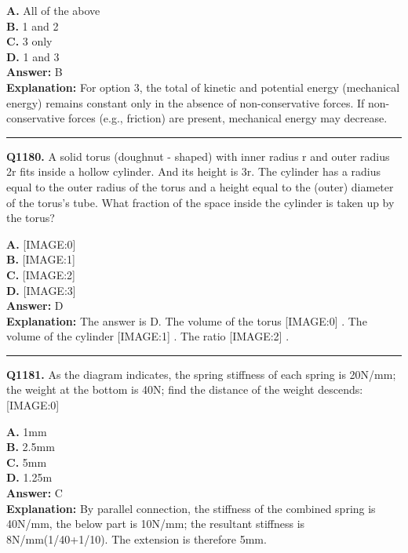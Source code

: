 \documentclass[12pt]{article}
\begin{document}
\textbf{A.} All of the above \\
\textbf{B.} 1 and 2 \\
\textbf{C.} 3 only \\
\textbf{D.} 1 and 3 \\

\textbf{Answer:} B \\
\textbf{Explanation:} For option 3, the total of kinetic and potential energy (mechanical energy) remains constant only in the absence of non-conservative forces. If non-conservative forces (e.g., friction) are present, mechanical energy may decrease.

\hrule
\vspace{1em}


\noindent
\textbf{Q1180.} A solid torus (doughnut - shaped) with inner radius r and outer radius 2r fits inside a hollow cylinder. And its height is 3r. The cylinder has a radius equal to the outer radius of the torus and a height equal to the (outer) diameter of the torus's tube. What fraction of the space inside the cylinder is taken up by the torus?



\textbf{A.} [IMAGE:0] \\
\textbf{B.} [IMAGE:1] \\
\textbf{C.} [IMAGE:2] \\
\textbf{D.} [IMAGE:3] \\

\textbf{Answer:} D \\
\textbf{Explanation:} The answer is D.
The volume of the torus
[IMAGE:0]
. The volume of the cylinder
[IMAGE:1]
. The ratio
[IMAGE:2]
.

\hrule
\vspace{1em}


\noindent
\textbf{Q1181.} As the diagram indicates, the spring stiffness of each spring is 20N/mm; the weight at the bottom is 40N; find the distance of the weight descends:
[IMAGE:0]



\textbf{A.} 1mm \\
\textbf{B.} 2.5mm \\
\textbf{C.} 5mm \\
\textbf{D.} 1.25m \\

\textbf{Answer:} C \\
\textbf{Explanation:} By parallel connection, the stiffness of the combined spring is 40N/mm, the below part is 10N/mm; the resultant stiffness is 8N/mm(1/40+1/10). The extension is therefore 5mm.
\end{document}

